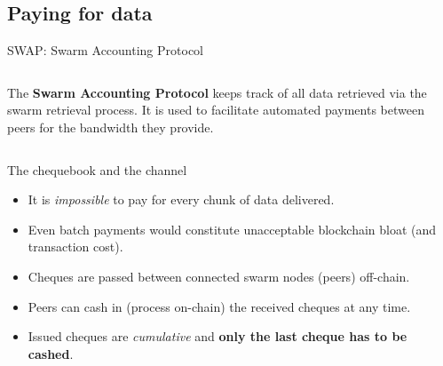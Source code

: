 \subsection[SWAP]{Paying for data}

\begin{frame}{SWAP: Swarm Accounting Protocol}
\begin{columns}[T]
\begin{column}{0.5\textwidth}
\small
The \textbf{Swarm Accounting Protocol} keeps track of all data retrieved via the swarm retrieval process. It is used to facilitate automated payments between peers for the bandwidth they provide.\\

\end{column}

\begin{column}{0.5\textwidth}
 \begin{center}
 \end{center}
\end{column}

\end{columns} 
\end{frame}

\begin{frame}{The chequebook and the channel}
 \begin{itemize}
  \item It is \emph{impossible} to pay for every chunk of data delivered.
  \item<2-> Even batch payments would constitute unacceptable blockchain bloat (and transaction cost).
 \end{itemize}
  \begin{itemize}
  \item<4-> Cheques are passed between connected swarm nodes (peers) off-chain.
  \item<4-> Peers can cash in (process on-chain) the received cheques at any time. 
  \item<4-> Issued cheques are \emph{cumulative} and \textbf{only the last cheque has to be cashed}.
 \end{itemize}
\end{frame}

